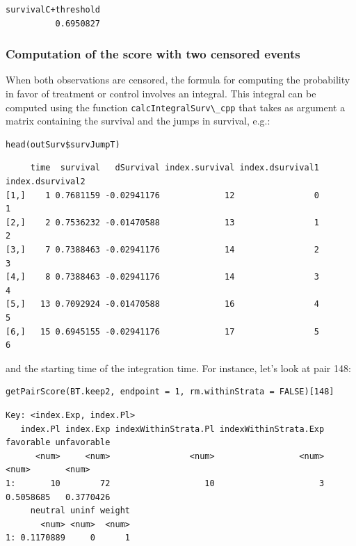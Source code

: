\documentclass[12pt]{article}
\begin{document}
\begin{verbatim}
survivalC+threshold 
          0.6950827
\end{verbatim}

\subsubsection{Computation of the score with two censored events}
\label{sec:org20a0714}

When both observations are censored, the formula for computing the
probability in favor of treatment or control involves an
integral. This integral can be computed using the function
\texttt{calcIntegralSurv\textbackslash{}\_cpp} that takes as argument a matrix containing the
survival and the jumps in survival, e.g.:
\lstset{language=r,label= ,caption= ,captionpos=b,numbers=none}
\begin{lstlisting}
head(outSurv$survJumpT)
\end{lstlisting}

\begin{verbatim}
     time  survival   dSurvival index.survival index.dsurvival1 index.dsurvival2
[1,]    1 0.7681159 -0.02941176             12                0                1
[2,]    2 0.7536232 -0.01470588             13                1                2
[3,]    7 0.7388463 -0.02941176             14                2                3
[4,]    8 0.7388463 -0.02941176             14                3                4
[5,]   13 0.7092924 -0.01470588             16                4                5
[6,]   15 0.6945155 -0.02941176             17                5                6
\end{verbatim}


and the starting time of the integration time. For instance, let's
look at pair 148:
\lstset{language=r,label= ,caption= ,captionpos=b,numbers=none}
\begin{lstlisting}
getPairScore(BT.keep2, endpoint = 1, rm.withinStrata = FALSE)[148]
\end{lstlisting}

\begin{verbatim}
Key: <index.Exp, index.Pl>
   index.Pl index.Exp indexWithinStrata.Pl indexWithinStrata.Exp favorable unfavorable
      <num>     <num>                <num>                 <num>     <num>       <num>
1:       10        72                   10                     3 0.5058685   0.3770426
     neutral uninf weight
       <num> <num>  <num>
1: 0.1170889     0      1
\end{verbatim}
\end{document}
